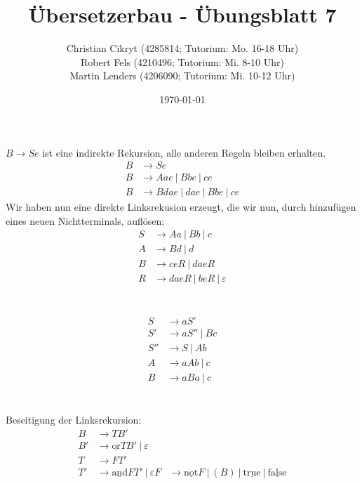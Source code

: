 \documentclass[a4paper,10pt]{scrartcl}
\title{Übersetzerbau - Übungsblatt 7}
\author{Christian Cikryt (4285814; Tutorium: Mo. 16-18 Uhr)\\
  Robert Fels (4210496; Tutorium: Mi. 8-10 Uhr)\\
  Martin Lenders (4206090; Tutorium: Mi. 10-12 Uhr)
  }
\date{\today}
\begin{document}
\maketitle

\section{}
$B \to Se$ ist eine indirekte Rekursion, alle anderen Regeln bleiben erhalten.
\begin{align*}
 B &\to Se \\
 B &\to Aae\ |\ Bbe\ |\ ce \\
 B &\to Bdae\ |\ dae\ |\ Bbe\ |\ ce
\end{align*}
Wir haben nun eine direkte Linksrekusion erzeugt, die wir nun, durch hinzufügen eines neuen Nichtterminals, auflösen:
\begin{align*}
 S &\to Aa\ |\ Bb\ |\ c \\
 A &\to Bd\ |\ d \\
 B &\to ceR\ |\ daeR \\
 R &\to daeR\ |\ beR\ |\ \varepsilon
\end{align*}

\section{}
\begin{align*}
 S &\to aS' \\
 S' &\to aS''\ |\ Bc \\
 S'' &\to S\ |\ Ab \\
 A &\to aAb\ |\ c \\
 B &\to aBa\ |\ c
\end{align*}

\section{}
Beseitigung der Linksrekursion:
\begin{align*}
 B &\to TB' \\
 B' &\to \underline{\textrm{or}} TB'\ |\ \varepsilon \\
 T &\to FT' \\
 T' &\to \underline{\textrm{and}} FT'\ |\ \varepsilon
 F &\to \underline{\textrm{not}} F\ |\ (B)\ |\ \underline{\textrm{true}}\ |\ \underline{\textrm{false}}
\end{align*}
\end{document}
